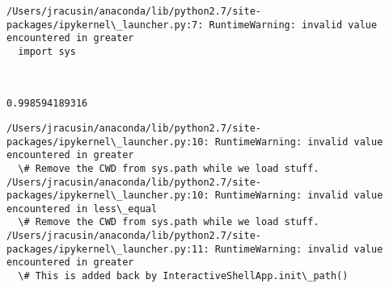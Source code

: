 \documentclass[11pt]{article}
\begin{document}
    \begin{Verbatim}[commandchars=\\\{\}]
/Users/jracusin/anaconda/lib/python2.7/site-packages/ipykernel\_launcher.py:7: RuntimeWarning: invalid value encountered in greater
  import sys

    \end{Verbatim}

    \begin{center}
    \end{center}
    { \hspace*{\fill} \\}
    
    \begin{Verbatim}[commandchars=\\\{\}]
0.998594189316

    \end{Verbatim}

    \begin{Verbatim}[commandchars=\\\{\}]
/Users/jracusin/anaconda/lib/python2.7/site-packages/ipykernel\_launcher.py:10: RuntimeWarning: invalid value encountered in greater
  \# Remove the CWD from sys.path while we load stuff.
/Users/jracusin/anaconda/lib/python2.7/site-packages/ipykernel\_launcher.py:10: RuntimeWarning: invalid value encountered in less\_equal
  \# Remove the CWD from sys.path while we load stuff.
/Users/jracusin/anaconda/lib/python2.7/site-packages/ipykernel\_launcher.py:11: RuntimeWarning: invalid value encountered in greater
  \# This is added back by InteractiveShellApp.init\_path()

    \end{Verbatim}
\end{document}
